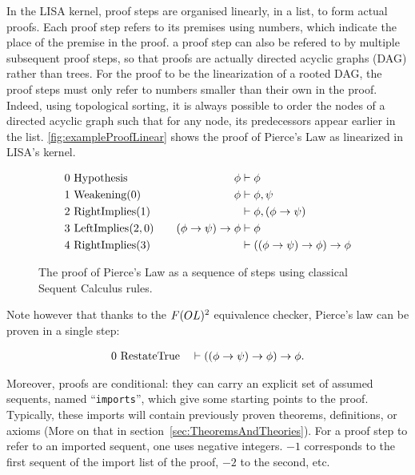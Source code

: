 In the LISA kernel, proof steps are organised linearly, in a list, to form actual proofs. Each proof step refers to its premises using numbers, which indicate the place of the premise in the proof.
a proof step can also be refered to by multiple subsequent proof steps, so that proofs are actually directed acyclic graphs (DAG) rather than trees. For the proof to be the linearization of a rooted DAG, the proof steps must only refer to numbers smaller than their own in the proof. Indeed, using topological sorting, it is always possible to order the nodes of a directed acyclic graph such that for any node, its predecessors appear earlier in the list.
\autoref{fig:exampleProofLinear} shows the proof of Pierce's Law as linearized in LISA's kernel.
%
\begin{figure}[ht]
  \begin{align*}
    0 & ~\text{\lstinline|Hypothesis|}       & \quad \phi                     & \vdash \phi                                \\
    1 & ~\text{\lstinline|Weakening|}(0)     & \quad  \phi                    & \vdash \phi, \psi                          \\
    2 & ~\text{\lstinline|RightImplies|}(1)  & \quad                          & \vdash \phi, (\phi \to \psi)               \\
    3 & ~\text{\lstinline|LeftImplies|}(2,0) & \quad (\phi \to \psi) \to \phi & \vdash \phi                                \\
    4 & ~\text{\lstinline|RightImplies|}(3)  & \quad                          & \vdash ((\phi \to \psi) \to \phi) \to \phi
  \end{align*}
  \caption{The proof of Pierce's Law as a sequence of steps using classical Sequent Calculus rules.}
  \label{fig:exampleProofLinear}
\end{figure}

\noindent
Note however that thanks to the $F(OL)\textsuperscript{2}$ equivalence checker, Pierce's law can be proven in a single step:

\begin{gather*}
    0  ~\text{\lstinline|RestateTrue|}        \quad \vdash ((\phi \to \psi) \to \phi) \to \phi .
\end{gather*}

Moreover, proofs are conditional: they can carry an explicit set of assumed sequents, named ``\lstinline|imports|'', which give some starting points to the proof. Typically, these imports will contain previously proven theorems, definitions, or axioms (More on that in section~\ref{sec:TheoremsAndTheories}). For a proof step to refer to an imported sequent, one uses negative integers. $-1$ corresponds to the first sequent of the import list of the proof, $-2$ to the second, etc.

